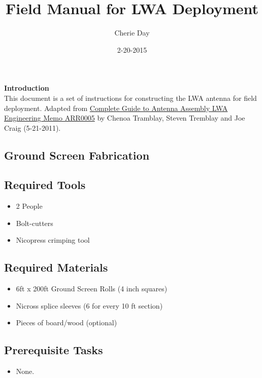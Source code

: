 \documentclass[12pt]{article}
\title{Field Manual for LWA Deployment}
\author{Cherie Day}
\date{2-20-2015}
\begin{document}
\maketitle

\center
{\bf Introduction} \\
This document is a set of instructions for constructing the LWA antenna for field deployment. Adapted from \underline{Complete Guide to Antenna Assembly LWA Engineering Memo ARR0005} by Chenoa Tramblay, Steven Tremblay and Joe Craig (5-21-2011).

\tableofcontents

\newpage

\begin{enumerate}

\section{Ground Screen Fabrication} \label{GNDscreenFabSec}
	\subsection{Required Tools}
		\begin{itemize}
			\item 2 People
			\item Bolt-cutters
			\item Nicopress crimping tool
		\end{itemize}
	\subsection{Required Materials}
		\begin{itemize}
			\item 6ft x 200ft Ground Screen Rolls (4 inch squares)
			\item Nicross splice sleeves (6 for every 10 ft section)
			\item Pieces of board/wood (optional)
		\end{itemize}
	\subsection{Prerequisite Tasks}
		\begin{itemize}
			\item None.
		\end{itemize}

\end{enumerate}
\end{document}
